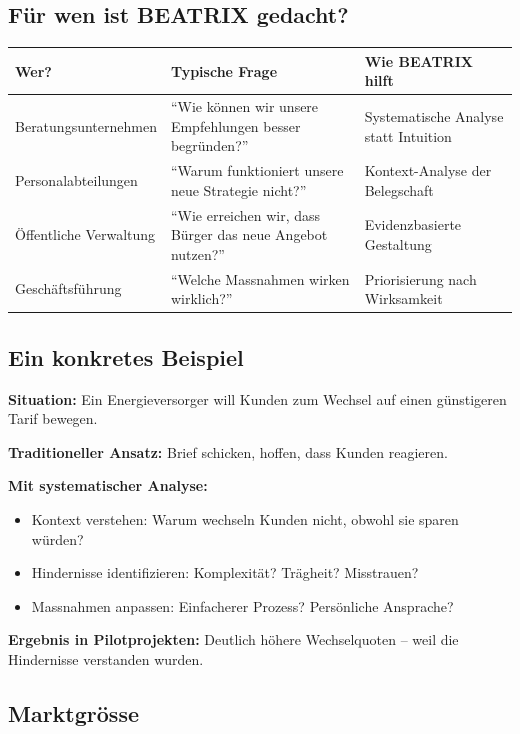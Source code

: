 \documentclass[11pt,a4paper]{article}
\begin{document}
\subsection{Für wen ist BEATRIX gedacht?}

\begin{table}[h]
\centering
\begin{tabularx}{\textwidth}{lXX}
\toprule
\textbf{Wer?} & \textbf{Typische Frage} & \textbf{Wie BEATRIX hilft} \\
\midrule
Beratungsunternehmen & ``Wie können wir unsere Empfehlungen besser begründen?'' & Systematische Analyse statt Intuition \\
Personalabteilungen & ``Warum funktioniert unsere neue Strategie nicht?'' & Kontext-Analyse der Belegschaft \\
Öffentliche Verwaltung & ``Wie erreichen wir, dass Bürger das neue Angebot nutzen?'' & Evidenzbasierte Gestaltung \\
Geschäftsführung & ``Welche Massnahmen wirken wirklich?'' & Priorisierung nach Wirksamkeit \\
\bottomrule
\end{tabularx}
\end{table}

\subsection{Ein konkretes Beispiel}

\textbf{Situation:} Ein Energieversorger will Kunden zum Wechsel auf einen günstigeren Tarif bewegen.

\textbf{Traditioneller Ansatz:} Brief schicken, hoffen, dass Kunden reagieren.

\textbf{Mit systematischer Analyse:}
\begin{itemize}[noitemsep]
    \item Kontext verstehen: Warum wechseln Kunden nicht, obwohl sie sparen würden?
    \item Hindernisse identifizieren: Komplexität? Trägheit? Misstrauen?
    \item Massnahmen anpassen: Einfacherer Prozess? Persönliche Ansprache?
\end{itemize}

\textbf{Ergebnis in Pilotprojekten:} Deutlich höhere Wechselquoten -- weil die Hindernisse verstanden wurden.

\subsection{Marktgrösse}
\end{document}
